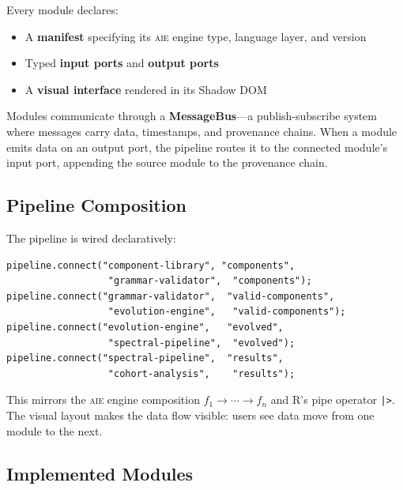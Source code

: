 \documentclass[11pt,letterpaper]{article}
\newcommand{\keyword}[1]{\textbf{\textcolor{accentpurple}{#1}}}
\newcommand{\aie}{\textsc{aie}}
\begin{document}
Every module declares:

\begin{itemize}[leftmargin=*]
  \item A \textbf{manifest} specifying its \aie{} engine type, language layer, and version
  \item Typed \textbf{input ports} and \textbf{output ports}
  \item A \textbf{visual interface} rendered in its Shadow DOM
\end{itemize}

Modules communicate through a \keyword{MessageBus}---a publish-subscribe system where messages carry data, timestamps, and provenance chains. When a module emits data on an output port, the pipeline routes it to the connected module's input port, appending the source module to the provenance chain.

\subsection{Pipeline Composition}

The pipeline is wired declaratively:

\begin{lstlisting}[language={}]
pipeline.connect("component-library", "components",
                  "grammar-validator",  "components");
pipeline.connect("grammar-validator",  "valid-components",
                  "evolution-engine",   "valid-components");
pipeline.connect("evolution-engine",   "evolved",
                  "spectral-pipeline",  "evolved");
pipeline.connect("spectral-pipeline",  "results",
                  "cohort-analysis",    "results");
\end{lstlisting}

This mirrors the \aie{} engine composition $f_1 \rightarrow \cdots \rightarrow f_n$ and R's pipe operator \texttt{|\textgreater}. The visual layout makes the data flow visible: users see data move from one module to the next.

\subsection{Implemented Modules}
\end{document}
